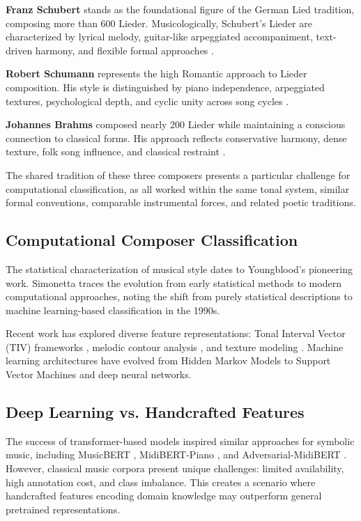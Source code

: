 \documentclass{article}
\begin{document}
\textbf{Franz Schubert} stands as the foundational figure of the German Lied tradition, composing more than 600 Lieder. Musicologically, Schubert's Lieder are characterized by lyrical melody, guitar-like arpeggiated accompaniment, text-driven harmony, and flexible formal approaches \cite{Rosen1995}.

\textbf{Robert Schumann} represents the high Romantic approach to Lieder composition. His style is distinguished by piano independence, arpeggiated textures, psychological depth, and cyclic unity across song cycles \cite{Daverio1997}.

\textbf{Johannes Brahms} composed nearly 200 Lieder while maintaining a conscious connection to classical forms. His approach reflects conservative harmony, dense texture, folk song influence, and classical restraint \cite{Musgrave1985}.

The shared tradition of these three composers presents a particular challenge for computational classification, as all worked within the same tonal system, similar formal conventions, comparable instrumental forces, and related poetic traditions.

\subsection{Computational Composer Classification}

The statistical characterization of musical style dates to Youngblood's \cite{Youngblood1958} pioneering work. Simonetta \cite{Simonetta2025} traces the evolution from early statistical methods to modern computational approaches, noting the shift from purely statistical descriptions to machine learning-based classification in the 1990s.

Recent work has explored diverse feature representations: Tonal Interval Vector (TIV) frameworks \cite{Herremans2016}, melodic contour analysis \cite{Pollastri2003}, and texture modeling \cite{Giraud2014}. Machine learning architectures have evolved from Hidden Markov Models \cite{HMM2001} to Support Vector Machines \cite{Alvarez2024} and deep neural networks.

\subsection{Deep Learning vs. Handcrafted Features}

The success of transformer-based models inspired similar approaches for symbolic music, including MusicBERT \cite{Chen2021}, MidiBERT-Piano \cite{Tsay2021}, and Adversarial-MidiBERT \cite{Zhao2025}. However, classical music corpora present unique challenges: limited availability, high annotation cost, and class imbalance. This creates a scenario where handcrafted features encoding domain knowledge may outperform general pretrained representations.
\end{document}

